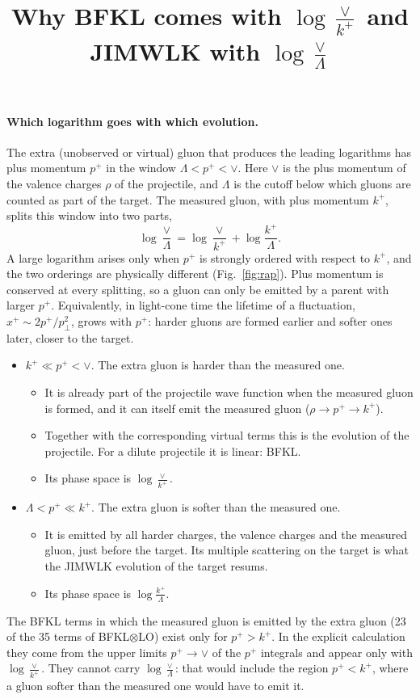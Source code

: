 \documentclass[11pt]{article}
\title{Why BFKL comes with $\log\frac{\vee}{k^+}$ and JIMWLK with $\log\frac{\vee}{\Lambda}$}
\date{}
\begin{document}
\maketitle

\paragraph{Which logarithm goes with which evolution.}
The extra (unobserved or virtual) gluon that produces the leading logarithms has plus momentum $p^+$ in the window $\Lambda<p^+<\vee$. Here $\vee$ is the plus momentum of the valence charges $\rho$ of the projectile, and $\Lambda$ is the cutoff below which gluons are counted as part of the target. The measured gluon, with plus momentum $k^+$, splits this window into two parts,
\begin{equation}
\log\frac{\vee}{\Lambda}=\log\frac{\vee}{k^+}+\log\frac{k^+}{\Lambda}.
\end{equation}
A large logarithm arises only when $p^+$ is strongly ordered with respect to $k^+$, and the two orderings are physically different (Fig.~\ref{fig:rap}). Plus momentum is conserved at every splitting, so a gluon can only be emitted by a parent with larger $p^+$. Equivalently, in light-cone time the lifetime of a fluctuation, $x^+\sim 2p^+/p_\perp^2$, grows with $p^+$: harder gluons are formed earlier and softer ones later, closer to the target.
\begin{itemize}
\item $k^+\ll p^+<\vee$. The extra gluon is harder than the measured one.
\begin{itemize}
\item It is already part of the projectile wave function when the measured gluon is formed, and it can itself emit the measured gluon ($\rho\to p^+\to k^+$).
\item Together with the corresponding virtual terms this is the evolution of the projectile. For a dilute projectile it is linear: BFKL.
\item Its phase space is $\log\frac{\vee}{k^+}$.
\end{itemize}
\item $\Lambda<p^+\ll k^+$. The extra gluon is softer than the measured one.
\begin{itemize}
\item It is emitted by all harder charges, the valence charges and the measured gluon, just before the target. Its multiple scattering on the target is what the JIMWLK evolution of the target resums.
\item Its phase space is $\log\frac{k^+}{\Lambda}$.
\end{itemize}
\end{itemize}
The BFKL terms in which the measured gluon is emitted by the extra gluon (23 of the 35 terms of BFKL$\otimes$LO) exist only for $p^+>k^+$. In the explicit calculation they come from the upper limits $p^+\to\vee$ of the $p^+$ integrals and appear only with $\log\frac{\vee}{k^+}$. They cannot carry $\log\frac{\vee}{\Lambda}$: that would include the region $p^+<k^+$, where a gluon softer than the measured one would have to emit it.
\end{document}
